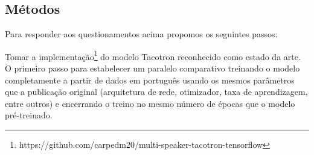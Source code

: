 \documentclass{article}
\begin{document}

\subsection{Métodos}
Para responder aos questionamentos acima propomos os seguintes passos:

Tomar a implementação\footnote{https://github.com/carpedm20/multi-speaker-tacotron-tensorflow} do modelo Tacotron \cite{tacotron2:DBLP:journals/corr/abs-1712-05884} reconhecido como estado da arte. O primeiro passo para estabelecer um paralelo comparativo treinando o modelo completamente a partir de dados em português usando os mesmos parâmetros que a publicação original (arquitetura de rede, otimizador, taxa de aprendizagem, entre outros) e encerrando o treino no mesmo número de épocas que o modelo pré-treinado.
\end{document}
